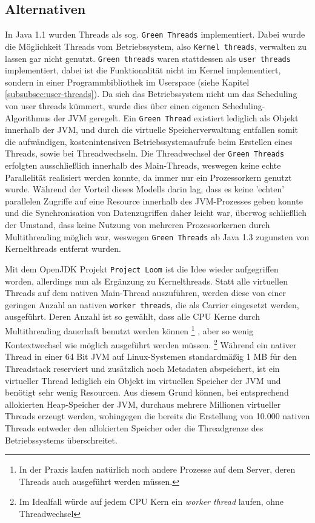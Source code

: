 \subsection{Alternativen}
\label{subsec:alternativen}
In Java 1.1 wurden Threads als sog. \verb|Green Threads| implementiert.
Dabei wurde die Möglichkeit Threads vom Betriebssystem, also \verb|Kernel threads|,
verwalten zu lassen gar nicht genutzt.
\verb|Green threads| waren stattdessen als \verb|user threads| implementiert,
dabei ist die Funktionalität
nicht im Kernel implementiert, sondern in einer Programmbibliothek im Userspace (siehe Kapitel \ref{subsubsec:user-threads}).
Da sich das Betriebssystem nicht um das Scheduling von user threads kümmert, wurde dies über einen eigenen
Scheduling-Algorithmus der JVM geregelt.\parencite{Oracle2010}
Ein \verb|Green Thread| existiert lediglich als Objekt innerhalb der JVM, und durch die virtuelle Speicherverwaltung entfallen
somit die aufwändigen, kostenintensiven Betriebssystemaufrufe beim
Erstellen eines Threads, sowie bei Threadwechseln.
Die Threadwechsel der \verb|Green Threads| erfolgten ausschließlich innerhalb des Main-Threads, weswegen keine echte Parallelität
realisiert werden konnte, da immer nur ein Prozessorkern genutzt wurde.
Während der Vorteil dieses Modells darin lag, dass es keine 'echten' parallelen Zugriffe auf eine Resource innerhalb des JVM-Prozesses geben konnte
und die Synchronisation von Datenzugriffen daher leicht war, überwog schließlich der Umstand, dass keine Nutzung von mehreren Prozessorkernen
durch Multithreading möglich war, weswegen \verb|Green Threads| ab Java 1.3 zugunsten von Kernelthreads entfernt wurden.

Mit dem OpenJDK Projekt \verb|Project Loom| ist die Idee
wieder aufgegriffen worden, allerdings nun als Ergänzung zu Kernelthreads.
Statt alle virtuellen Threads auf dem nativen Main-Thread auszuführen, werden diese von einer geringen Anzahl an
nativen \verb|worker threads|,
die als Carrier eingesetzt werden, ausgeführt.
Deren Anzahl ist so gewählt, dass alle CPU Kerne durch Multithreading dauerhaft benutzt werden können
\footnote{In der Praxis laufen natürlich noch andere Prozesse auf dem Server, deren Threads auch ausgeführt werden müssen.}
, aber so wenig Kontextwechsel wie möglich ausgeführt werden müssen.\parencite{Oracle2021}
\footnote{Im Idealfall würde auf jedem CPU Kern ein \textit{worker thread} laufen, ohne Threadwechsel}
Während ein nativer Thread in einer 64 Bit JVM auf Linux-Systemen standardmäßig 1 MB für den Threadstack reserviert
und zusätzlich noch Metadaten abspeichert, ist ein virtueller Thread
lediglich ein Objekt im virtuellen Speicher der JVM und benötigt sehr wenig Resourcen.
Aus diesem Grund können, bei entsprechend allokierten Heap-Speicher der JVM, durchaus mehrere Millionen virtueller Threads erzeugt werden, wohingegen
die bereits die Erstellung von 10.000 nativen Threads entweder den allokierten Speicher oder die Threadgrenze
des Betriebssystems überschreitet.

